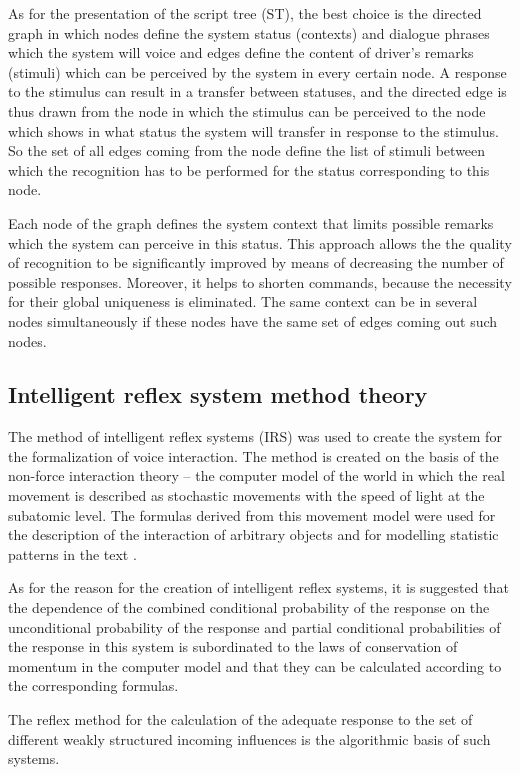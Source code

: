 \documentclass[review,authoryear]{elsarticle}
\begin{document}
As for the presentation of the script tree (ST), the best choice is the directed graph in which nodes define the system status (contexts) and dialogue phrases which the system will voice and edges define the content of driver’s remarks (stimuli) which can be perceived by the system in every certain node. A response to the stimulus can result in a transfer between statuses, and the directed edge is thus drawn from the node in which the stimulus can be perceived to the node which shows in what status the system will transfer in response to the stimulus. So the set of all edges coming from the node define the list of stimuli between which the recognition has to be performed for the status corresponding to this node. 

Each node of the graph defines the system context that limits possible remarks which the system can perceive in this status. This approach allows the the quality of recognition to be significantly improved by means of decreasing the number of possible responses. Moreover, it helps to shorten commands, because the necessity for their global uniqueness is eliminated. The same context can be in several nodes simultaneously if these nodes have the same set of edges coming out such nodes. 

\subsection{Intelligent reflex system method theory} 

The method of intelligent reflex systems (IRS) was used to create the system for the formalization of voice interaction. The method is created on the basis of the non-force interaction theory – the computer model of the world in which the real movement is described as stochastic movements with the speed of light at the subatomic level. The formulas derived from this movement model were used for the description of the interaction of arbitrary objects and for modelling statistic patterns in the text \citep{eng_Teslia_2010}. 

As for the reason for the creation of intelligent reflex systems, it is suggested that the dependence of the combined conditional probability of the response on the unconditional probability of the response and partial conditional probabilities of the response in this system is subordinated to the laws of conservation of momentum in the computer model and that they can be calculated according to the corresponding formulas. 

The reflex method for the calculation of the adequate response to the set of different weakly structured incoming influences is the algorithmic basis of such systems. 
\end{document}
